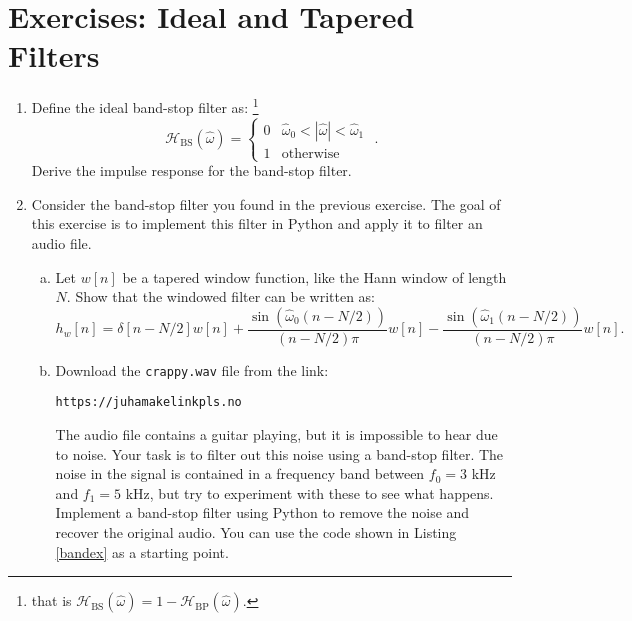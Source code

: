 \newpage
\section{Exercises: Ideal and Tapered Filters}

\begin{enumerate}
\item Define the ideal band-stop filter as: \footnote{that is $\mathcal{H}_{\mathrm{BS}}(\hat{\omega})=1 - \mathcal{H}_{\mathrm{BP}}(\hat{\omega})$.}
\begin{equation}
\mathcal{H}_{\mathrm{BS}}(\hat{\omega}) = \left\{ \begin{array}{cc}
0 & \hat{\omega}_0 < |\hat{\omega}| < \hat{\omega}_1 \\
1 & \mathrm{otherwise}
\end{array}\right.\,\,.
\end{equation}
Derive the impulse response for the band-stop filter.

\item Consider the band-stop filter you found in the previous exercise. 
The goal of this exercise is to implement this filter in Python and apply it to filter an audio file.

\begin{enumerate}[a)]
\item Let $w[n]$ be a tapered window function, like the Hann window of length $N$. Show that the windowed filter can be written as:
$$h_{w}[n]=\delta[n-N/2]w[n] +  \frac{\sin(\hat{\omega}_{0}(n-N/2))}{(n-N/2)\pi}w[n] - \frac{\sin(\hat{\omega}_{1}(n-N/2))}{(n-N/2)\pi}w[n].$$

\item Download the \verb|crappy.wav| file from the link:
\begin{center}
\verb|https://juhamakelinkpls.no| 
\end{center}
The audio file contains a guitar playing, but it is impossible to hear due to noise. 
Your task is to filter out this noise using a band-stop filter. 
The noise in the signal is contained in a frequency band between $f_{0}=3$ kHz and $f_{1}=5$ kHz, 
but try to experiment with these to see what happens. Implement a band-stop filter using 
Python to remove the noise and recover the original audio. You can use the code shown in Listing \ref{bandex} 
as a starting point. 
\end{enumerate}



\end{enumerate}
